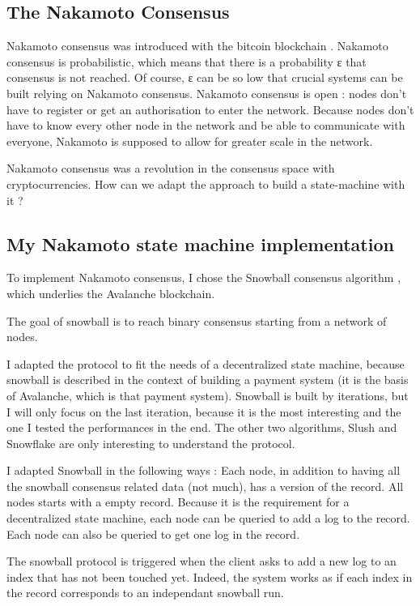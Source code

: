 \documentclass[11pt, twocolumn]{article}
\begin{document}
\subsection{The Nakamoto Consensus}

Nakamoto consensus was introduced with the bitcoin blockchain \cite{bitcoin}. Nakamoto consensus is probabilistic, which means that there is a probability ε that consensus is not reached.
Of course, ε can be so low that crucial systems can be built relying on Nakamoto consensus. Nakamoto consensus is open : nodes don't have to register or get an authorisation to enter the network.
Because nodes don't have to know every other node in the network and be able to communicate with everyone, Nakamoto is supposed to allow for greater scale in the network.

Nakamoto consensus was a revolution in the consensus space with cryptocurrencies. How can we adapt the approach to build a state-machine with it ?

\subsection{My Nakamoto state machine implementation}

To implement Nakamoto consensus, I chose the Snowball consensus algorithm \cite{snowprotocol}, which underlies the Avalanche blockchain.

The goal of snowball is to reach binary consensus starting from a network of nodes.

I adapted the protocol to fit the needs of a decentralized state machine, because snowball is described in the context of building a payment system (it is the basis of Avalanche, which is that payment system).
Snowball is built by iterations, but I will only focus on the last iteration, because it is the most interesting and the one I tested the performances in the end. 
The other two algorithms, Slush and Snowflake are only interesting to understand the protocol.

I adapted Snowball in the following ways : Each node, in addition to having all the snowball consensus related data (not much), has a version of the record. All nodes starts with a empty record.
Because it is the requirement for a decentralized state machine, each node can be queried to add a log to the record. Each node can also be queried to get one log in the record.

The snowball protocol is triggered when the client asks to add a new log to an index that has not been touched yet. Indeed, the system works as if each index in the record corresponds to an independant snowball run.
\end{document}
